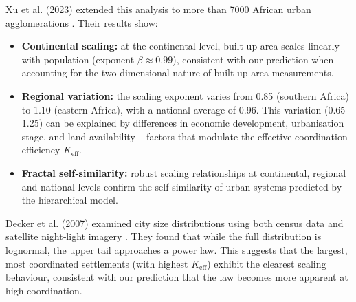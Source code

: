 \documentclass[11pt]{article}
\theoremstyle{remark}
\newcommand{\Keff}{K_{\mathrm{eff}}}
\begin{document}
	Xu et al. (2023) extended this analysis to more than 7000 African urban agglomerations \cite{Xu2023}. Their results show:
	\begin{itemize}
		\item \textbf{Continental scaling:} at the continental level, built‑up area scales linearly with population (exponent \(\beta \approx 0.99\)), consistent with our prediction when accounting for the two‑dimensional nature of built‑up area measurements.
		\item \textbf{Regional variation:} the scaling exponent varies from 0.85 (southern Africa) to 1.10 (eastern Africa), with a national average of 0.96. This variation (0.65–1.25) can be explained by differences in economic development, urbanisation stage, and land availability – factors that modulate the effective coordination efficiency \(\Keff\).
		\item \textbf{Fractal self‑similarity:} robust scaling relationships at continental, regional and national levels confirm the self‑similarity of urban systems predicted by the hierarchical model.
	\end{itemize}
	
	Decker et al. (2007) examined city size distributions using both census data and satellite night‑light imagery \cite{Decker2007}. They found that while the full distribution is lognormal, the upper tail approaches a power law. This suggests that the largest, most coordinated settlements (with highest \(\Keff\)) exhibit the clearest scaling behaviour, consistent with our prediction that the law becomes more apparent at high coordination.
	
\end{document}
